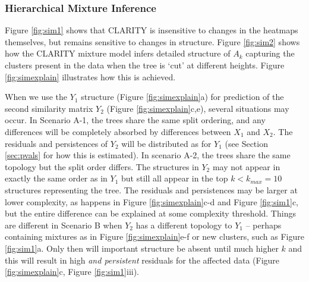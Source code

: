 \documentclass[a4]{article}
\newcommand{\+}[1]{\mathbf{#1}}
\begin{document}
\subsubsection{Hierarchical Mixture Inference}

Figure \ref{fig:sim1} shows that CLARITY is insensitive to changes in the heatmaps themselves, but remains sensitive to changes in structure.
Figure \ref{fig:sim2} shows how the CLARITY mixture model infers detailed structure of $A_k$ capturing the clusters present in the data when the tree is `cut' at different heights.
Figure \ref{fig:simexplain} illustrates how this is achieved.

When we use the $Y_1$ structure (Figure \ref{fig:simexplain}a) for prediction of the second similarity matrix $Y_2$ (Figure \ref{fig:simexplain}c,e), several situations may occur. In Scenario A-1, the trees share the same split ordering, and any differences will be completely absorbed by differences between $X_1$ and $X_2$. The residuals and persistences of $Y_2$  will be distributed as for  $Y_1$ (see Section \ref{sec:pvals} for how this is estimated). 
In scenario A-2, the trees share the same topology but the split order differs. The structures in $Y_2$ may not appear in exactly the same order as in $Y_1$ but still all appear in the top $k<k_{max}=10$ structures representing the tree.
The residuals and persistences may be larger at lower complexity, as happens in Figure \ref{fig:simexplain}c-d and Figure \ref{fig:sim1}c, but the entire difference can be explained at some complexity threshold. 
Things are different in Scenario B when $Y_2$ has a different topology to $Y_1$ -- perhaps containing mixtures as in Figure \ref{fig:simexplain}e-f or new clusters, such as Figure \ref{fig:sim1}a. Only then will important structure be absent until much higher $k$ and this will result in high \emph{and persistent} residuals for the affected data (Figure \ref{fig:simexplain}c, Figure \ref{fig:sim1}iii).


\end{document}
